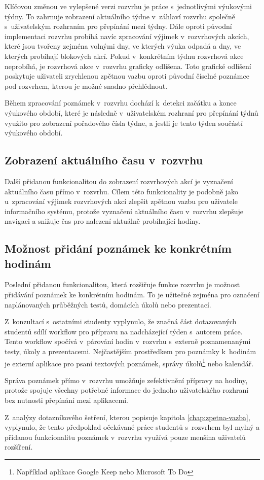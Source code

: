 Klíčovou změnou ve vylepšené verzi rozvrhu je práce s~jednotlivými výukovými týdny. To zahrnuje zobrazení aktuálního týdne v~záhlaví rozvrhu společně s~uživatelským rozhraním pro přepínání mezi týdny. Dále oproti původní implementaci rozvrhu probíhá navíc zpracování výjimek v~rozvrhových akcích, které jsou tvořeny zejména volnými dny, ve kterých výuka odpadá a dny, ve kterých probíhají blokových akcí. Pokud v~konkrétním týdnu rozvrhová akce neprobíhá, je rozvrhová akce v~rozvrhu graficky odlišena. Toto grafické odlišení poskytuje uživateli zrychlenou zpětnou vazbu oproti původní číselné poznámce pod rozvrhem, kterou je možné snadno přehlédnout.

Během zpracování poznámek v~rozvrhu dochází k~detekci začátku a konce výukového období, které je následně v~uživatelském rozhraní pro přepínání týdnů využito pro zobrazení pořadového čísla týdne, a jestli je tento týden součástí výukového období.

\subsection{Zobrazení aktuálního času v~rozvrhu}

Další přidanou funkcionalitou do zobrazení rozvrhových akcí je vyznačení aktuálního času přímo v~rozvrhu. Cílem této funkcionality je podobně jako u~zpracování výjimek rozvrhových akcí zlepšit zpětnou vazbu pro uživatele informačního systému, protože vyznačení aktuálního času v~rozvrhu zlepšuje navigaci a snižuje čas pro nalezení aktuálně probíhající hodiny. 

\subsection{Možnost přidání poznámek ke konkrétním hodinám}

Poslední přidanou funkcionalitou, která rozšiřuje funkce rozvrhu je možnost přidávání poznámek ke konkrétním hodinám. To je užitečné zejména pro označení naplánovaných průběžných testů, domácích úkolů nebo prezentací. 

Z~konzultací s~ostatními studenty vyplynulo, že značná část dotazovaných studentů sdílí workflow pro přípravu na nadcházející týden s~autorem práce. Tento workflow spočívá v~párování hodin v~rozvrhu s~externě poznamenanými testy, úkoly a prezentacemi. Nejčastějším prostředkem pro poznámky k~hodinám je externí aplikace pro psaní textových poznámek, správy úkolů\footnote{Například aplikace Google Keep nebo Microsoft To Do} nebo kalendář.

Správa poznámek přímo v~rozvrhu umožňuje zefektivnění přípravy na hodiny, protože spojuje všechny potřebné informace do jednoho uživatelského rozhraní bez nutnosti přepínání mezi aplikacemi.

Z~analýzy dotazníkového šetření, kterou popisuje kapitola \ref{chap:zpetna-vazba}, vyplynulo, že tento předpoklad očekávané práce studentů s~rozvrhem byl mylný a přidanou funkcionalitu poznámek v~rozvrhu využívá pouze menšina uživatelů rozšíření.
